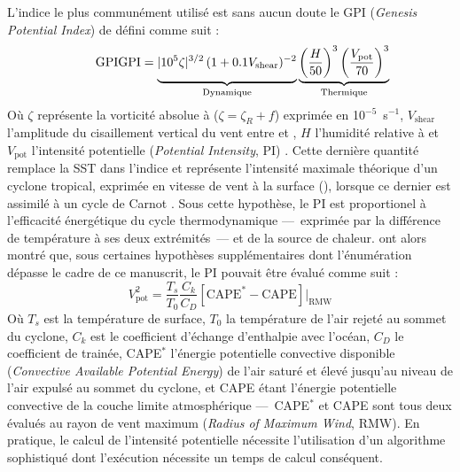 \documentclass[../main.tex]{subfiles}
\begin{document}
L'indice le plus communément utilisé est sans aucun doute le GPI (\textit{Genesis Potential Index}) de \textcite{emanuel_tropical_2004} défini comme suit :
%
\begin{equation*}
    \tag*{GPI}
    \mathrm{GPI} = \underbrace{\vphantom{\left( \frac{H}{50} \right)^3}\lvert 10^5 \zeta \rvert^{3/2} \, (1 + 0.1 V_{\mathrm{shear}})^{-2}}_{\mathrm{Dynamique}}
    \underbrace{\left( \frac{H}{50} \right)^3 \left( \frac{V_{\mathrm{pot}}}{70} \right)^3}_{\mathrm{Thermique}}
\end{equation*}
%
Où $\zeta$ représente la vorticité absolue à  ($\zeta = \zeta_R + f$) exprimée en 10$^{-5}$~s$^{-1}$, $V_{\mathrm{shear}}$ l'amplitude du cisaillement
vertical du vent entre  et , $H$ l'humidité relative à  et $V_{\mathrm{pot}}$ l'intensité potentielle (\textit{Potential Intensity},
PI) \parencite{emanuel_airsea_1986,emanuel_sensitivity_1995,bister_dissipative_1998,bister_low_2002}. Cette dernière quantité remplace la SST dans l'indice et
représente l'intensité maximale théorique d'un cyclone tropical, exprimée en vitesse de vent à la surface (\ms{}), lorsque ce dernier est assimilé à un cycle de
Carnot \parencite{emanuel_dependence_1987}. Sous cette hypothèse, le PI est proportionel à l'efficacité énergétique du cycle thermodynamique ---~exprimée par la
différence de température à ses deux extrémités~--- et de la source de chaleur. \textcite{bister_low_2002} ont alors montré que, sous certaines hypothèses
supplémentaires dont l'énumération dépasse le cadre de ce manuscrit, le PI pouvait être évalué comme suit :
%
\begin{equation*}
    \tag*{PI}
    V_{\mathrm{pot}}^2 = \frac{T_s}{T_0} \frac{C_k}{C_D} \left[ \mathrm{CAPE}^* - \mathrm{CAPE} \right] \rvert_{\mathrm{RMW}}
\end{equation*}
%
Où $T_s$ est la température de surface, $T_0$ la température de l'air rejeté au sommet du cyclone, $C_k$ est le coefficient d'échange d'enthalpie avec l'océan,
$C_D$ le coefficient de trainée, CAPE$^*$ l'énergie potentielle convective disponible (\textit{Convective Available Potential Energy}) de l'air saturé et élevé
jusqu'au niveau de l'air expulsé au sommet du cyclone, et CAPE étant l'énergie potentielle convective de la couche limite atmosphérique ---~CAPE$^*$ et CAPE
sont tous deux évalués au rayon de vent maximum (\textit{Radius of Maximum Wind}, RMW). En pratique, le calcul de l'intensité potentielle nécessite
l'utilisation d'un algorithme sophistiqué dont l'exécution nécessite un temps de calcul conséquent.
\end{document}
